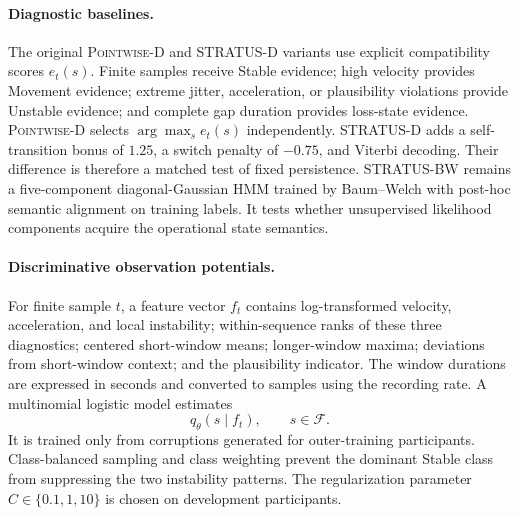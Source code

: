 \documentclass[sigconf,review]{acmart}
\newcommand{\methodP}{\textsc{Pointwise-D}\xspace}
\newcommand{\methodD}{\textsc{STRATUS-D}\xspace}
\newcommand{\methodBW}{\textsc{STRATUS-BW}\xspace}
\begin{document}
\paragraph{Diagnostic baselines.}
The original \methodP and \methodD variants use explicit compatibility scores $e_t(s)$. Finite samples receive Stable evidence; high velocity provides Movement evidence; extreme jitter, acceleration, or plausibility violations provide Unstable evidence; and complete gap duration provides loss-state evidence. \methodP selects $\arg\max_s e_t(s)$ independently. \methodD adds a self-transition bonus of $1.25$, a switch penalty of $-0.75$, and Viterbi decoding. Their difference is therefore a matched test of fixed persistence. \methodBW remains a five-component diagonal-Gaussian HMM trained by Baum--Welch with post-hoc semantic alignment on training labels. It tests whether unsupervised likelihood components acquire the operational state semantics.

\paragraph{Discriminative observation potentials.}
For finite sample $t$, a feature vector $f_t$ contains log-transformed velocity, acceleration, and local instability; within-sequence ranks of these three diagnostics; centered short-window means; longer-window maxima; deviations from short-window context; and the plausibility indicator. The window durations are expressed in seconds and converted to samples using the recording rate. A multinomial logistic model estimates
\[
q_\theta(s\mid f_t), \qquad s\in\mathcal F.
\]
It is trained only from corruptions generated for outer-training participants. Class-balanced sampling and class weighting prevent the dominant Stable class from suppressing the two instability patterns. The regularization parameter $C\in\{0.1,1,10\}$ is chosen on development participants.
\end{document}
